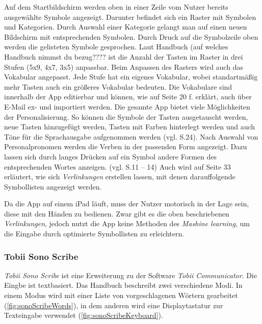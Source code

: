            Auf dem Startbildschirm werden oben in einer Zeile vom Nutzer bereits ausgewählte Symbole angezeigt. Darunter befindet sich ein Raster mit Symbolen und Kategorien. Durch Auswahl einer Kategorie gelangt man auf einen neuen Bildschirm mit entsprechenden Symbolen.
            Durch Druck auf die Symbolzeile oben werden die gelisteten Symbole gesprochen. 
            Laut Handbuch (auf welches Handbuch nimmst du bezug????\parencite[S. 7 ff]{cidar:metaTalkManual} ist die Anzahl der Tasten im Raster in drei Stufen (5x9, 4x7, 3x5) anpassbar. Beim Anpassen des Rasters wird auch das Vokabular angepasst. Jede Stufe hat ein eigenes Vokabular, wobei standartmäßig mehr Tasten auch ein größeres Vokabular bedeuten. Die Vokabulare sind innerhalb der App editierbar und können, wie auf Seite 20 f. erklärt, auch über E-Mail ex- und importiert werden. Die gesamte App bietet viele Möglichkeiten der Personalisierung. So können die Symbole der Tasten ausgetauscht werden, neue Tasten hinzugefügt werden, Tasten mit Farben hinterlegt werden und auch Töne für die Sprachausgabe aufgenommen werden (vgl. S.24). Nach Auswahl von Personalpronomen werden die Verben in der passenden Form angezeigt. Dazu lassen sich durch langes Drücken auf ein Symbol andere Formen des entsprechenden Wortes anzeigen. (vgl. S.11 – 14) Auch wird auf Seite 33 erläutert, wie sich \emph{Verlinkungen} erstellen lassen, mit denen darauffolgende Symbollisten angezeigt werden.
            
            Da die App auf einem iPad läuft, muss der Nutzer motorisch in der Lage sein, diese mit den Händen zu bedienen. Zwar gibt es die oben beschriebenen \emph{Verlinkungen}, jedoch nutzt die App keine Methoden des \emph{Mashine learning}, um die Eingabe durch optimierte Symbollisten zu erleichtern.
            
        \subsubsection*{Tobii Sono Scribe}
        
        	\emph{Tobii Sono Scribe} ist eine Erweiterung zu der Software \emph{Tobii Communicator}. Die Eingbe ist textbasiert. Das Handbuch \parencite[S. 8]{tobii:sonoScribeManual} beschreibt zwei verschiedene Modi. In einem Modus wird mit einer Liste von vorgeschlagenen Wörtern gearbeitet (\autoref{fig:sonoScribeWords}), in dem anderen wird eine Displaytastatur zur Texteingabe verwendet (\autoref{fig:sonoScribeKeyboard}).
            
